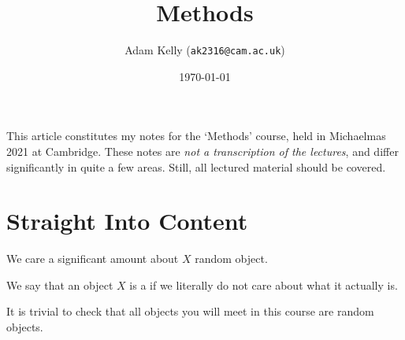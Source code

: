 \documentclass[a4paper]{scrartcl}
\title{Methods}
\author{Adam Kelly (\texttt{ak2316@cam.ac.uk})}
\date{\today}
\begin{document}
\maketitle

% 


This article constitutes my notes for the `Methods' course, held in Michaelmas 2021 at Cambridge. These notes are \emph{not a transcription of the lectures}, and differ significantly in quite a few areas. Still, all lectured material should be covered.



\tableofcontents


\section{Straight Into Content} 


We care a significant amount about $X$ random object.

\begin{definition}
    We say that an object $X$ is a  if we literally do not care about what it actually is.
\end{definition}

It is trivial to check that all objects you will meet in this course are random objects.
\end{document}

